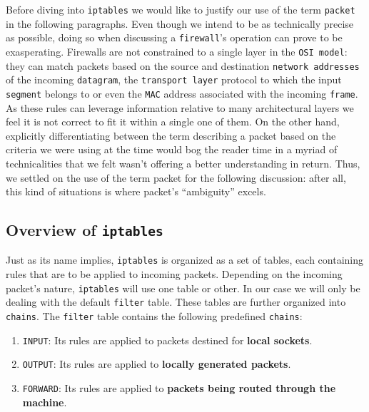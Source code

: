         Before diving into \texttt{iptables} we would like to justify our use of the term \texttt{packet} in the following paragraphs. Even though we intend to be as technically precise as possible, doing so when discussing a \texttt{firewall}'s operation can prove to be exasperating. Firewalls are not constrained to a single layer in the \texttt{OSI model}: they can match packets based on the source and destination \texttt{network addresses} of the incoming \texttt{datagram}, the \texttt{transport layer} protocol to which the input \texttt{segment} belongs to or even the \texttt{MAC} address associated with the incoming \texttt{frame}. As these rules can leverage information relative to many architectural layers we feel it is not correct to fit it within a single one of them. On the other hand, explicitly differentiating between the term describing a packet based on the criteria we were using at the time would bog the reader time in a myriad of technicalities that we felt wasn't offering a better understanding in return. Thus, we settled on the use of the term packet for the following discussion: after all, this kind of situations is where packet's ``ambiguity'' excels.\\

        \subsection{Overview of \texttt{iptables}}
            Just as its name implies, \texttt{iptables} is organized as a set of tables, each containing rules that are to be applied to incoming packets. Depending on the incoming packet's nature, \texttt{iptables} will use one table or other. In our case we will only be dealing with the default \texttt{filter} table. These tables are further organized into \texttt{chains}. The \texttt{filter} table contains the following predefined \texttt{chains}:\\

            \begin{enumerate}
                \item \texttt{INPUT}: Its rules are applied to packets destined for \textbf{local sockets}.
                \item \texttt{OUTPUT}: Its rules are applied to \textbf{locally generated packets}.
                \item \texttt{FORWARD}: Its rules are applied to \textbf{packets being routed through the machine}.
            \end{enumerate}


